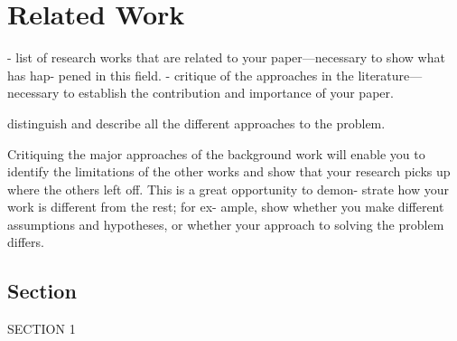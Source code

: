 
\setcounter{chapter}{0}

\chapter{Related Work}
\label{chap:relatedwork}

- list of research works that are related to your paper—necessary to show what has hap-
pened in this field.
- critique of the approaches in the literature—necessary to establish the
contribution and importance of your paper.

distinguish and describe all the different approaches to the problem.

Critiquing the major approaches of the background
work will enable you to identify the limitations of the
other works and show that your research picks up where
the others left off. This is a great opportunity to demon-
strate how your work is different from the rest; for ex-
ample, show whether you make different assumptions
and hypotheses, or whether your approach to solving the
problem differs.

\section{Section}

SECTION 1
